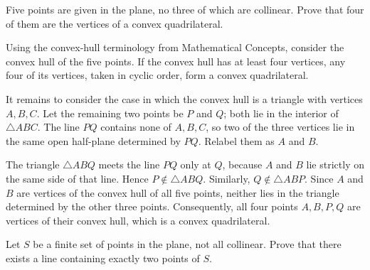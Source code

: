     \begin{expectedproblem}
        Five points are given in the plane, no three of which are collinear.
        Prove that four of them are the vertices of a convex quadrilateral.
    \end{expectedproblem}

    \begin{solution}
        Using the convex-hull terminology from Mathematical Concepts, consider
        the convex hull of the five points. If the convex hull has at
        least four vertices, any four of its vertices, taken in cyclic order,
        form a convex quadrilateral.

        It remains to consider the case in which the convex hull is a triangle
        with vertices $A,B,C$. Let the remaining two points be $P$ and $Q$;
        both lie in the interior of $\triangle ABC$. The line $PQ$ contains none
        of $A,B,C$, so two of the three vertices lie in the same open half-plane
        determined by $PQ$. Relabel them as $A$ and $B$.

        The triangle $\triangle ABQ$ meets the line $PQ$ only at $Q$, because
        $A$ and $B$ lie strictly on the same side of that line. Hence
        $P\notin\triangle ABQ$. Similarly, $Q\notin\triangle ABP$. Since
        $A$ and $B$ are vertices of the convex hull of all five points, neither
        lies in the triangle determined by the other three points. Consequently,
        all four points $A,B,P,Q$ are vertices of their convex hull, which is a
        convex quadrilateral.
    \end{solution}

    \begin{expectedproblem}
        Let $S$ be a finite set of points in the plane, not all collinear. Prove
        that there exists a line containing exactly two points of $S$.
    \end{expectedproblem}

